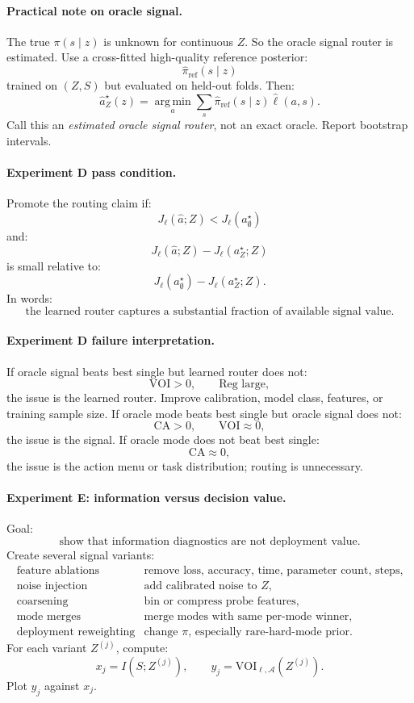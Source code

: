 \documentclass{article}
\providecommand{\argmin}{\operatorname*{arg\,min}}
\begin{document}
\paragraph{Practical note on oracle signal.}
The true \(\pi(s\mid z)\) is unknown for continuous \(Z\).
So the oracle signal router is estimated.
Use a cross-fitted high-quality reference posterior:
\[
    \hat \pi_{\mathrm{ref}}(s\mid z)
\]
trained on \((Z,S)\) but evaluated on held-out folds.
Then:
\[
    \hat a_Z^\star(z)
    =
    \argmin_a\sum_s\hat\pi_{\mathrm{ref}}(s\mid z)\hat\ell(a,s).
\]
Call this an \emph{estimated oracle signal router}, not an exact oracle.
Report bootstrap intervals.

\paragraph{Experiment D pass condition.}
Promote the routing claim if:
\[
    J_\ell(\hat a;Z)<J_\ell(a^\star_{\emptyset})
\]
and:
\[
    J_\ell(\hat a;Z)-J_\ell(a^\star_Z;Z)
\]
is small relative to:
\[
    J_\ell(a^\star_{\emptyset})-J_\ell(a^\star_Z;Z).
\]
In words:
\[
    \text{the learned router captures a substantial fraction of available signal value.}
\]

\paragraph{Experiment D failure interpretation.}
If oracle signal beats best single but learned router does not:
\[
    \mathrm{VOI}>0,
    \qquad
    \mathrm{Reg}\text{ large},
\]
the issue is the learned router.
Improve calibration, model class, features, or training sample size.
If oracle mode beats best single but oracle signal does not:
\[
    \mathrm{CA}>0,
    \qquad
    \mathrm{VOI}\approx 0,
\]
the issue is the signal.
If oracle mode does not beat best single:
\[
    \mathrm{CA}\approx 0,
\]
the issue is the action menu or task distribution; routing is unnecessary.

\paragraph{Experiment E: information versus decision value.}
Goal:
\[
    \text{show that information diagnostics are not deployment value.}
\]
Create several signal variants:
\[
\begin{array}{ll}
    \text{feature ablations} & \text{remove loss, accuracy, time, parameter count, steps},\\
    \text{noise injection} & \text{add calibrated noise to \(Z\)},\\
    \text{coarsening} & \text{bin or compress probe features},\\
    \text{mode merges} & \text{merge modes with same per-mode winner},\\
    \text{deployment reweighting} & \text{change \(\pi\), especially rare-hard-mode prior}.
\end{array}
\]
For each variant \(Z^{(j)}\), compute:
\[
    x_j=I(S;Z^{(j)}),
    \qquad
    y_j=\mathrm{VOI}_{\ell,\mathcal A}(Z^{(j)}).
\]
Plot \(y_j\) against \(x_j\).
\end{document}
